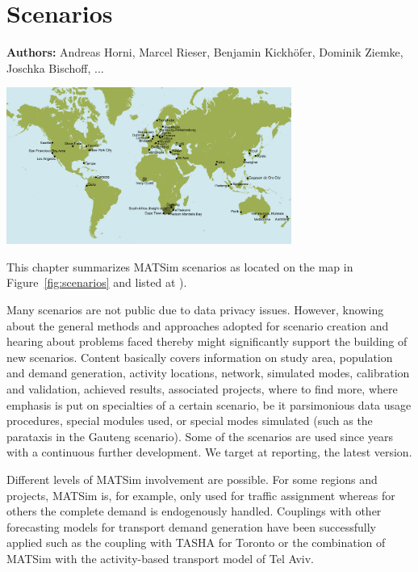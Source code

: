 \chapter{Scenarios}
\label{ch:scenarios}

\hfill \textbf{Authors:} Andreas Horni, Marcel Rieser, Benjamin Kickhöfer, Dominik Ziemke, Joschka Bischoff, ...

\begin{center} \includegraphics[width=0.7\textwidth, angle=0]{using/figures/MATSimModelsMap} \end{center}

This chapter summarizes MATSim scenarios as located on the map in Figure~\ref{fig:scenarios} and listed at \citet[][]{MATSIM-T-Scenarios_Webpage_2014}).

Many scenarios are not public due to data privacy issues. However, knowing about the general methods and approaches adopted for scenario creation and hearing about problems faced thereby might significantly support the building of new scenarios. Content basically covers information on study area, population and demand generation, activity locations, network, simulated modes, calibration and validation, achieved results, associated projects, where to find more, where emphasis is put on specialties of a certain scenario, be it parsimonious data usage procedures, special modules used, or special modes simulated (such as the parataxis in the Gauteng scenario). Some of the scenarios are used since years with a continuous further development. We target at reporting, the latest version. 

Different levels of MATSim involvement are possible. For some regions and projects, MATSim is, for example, only used for traffic assignment whereas for others the complete demand is endogenously handled. Couplings with other forecasting models for transport demand generation have been successfully applied such as the coupling with TASHA for Toronto or the combination of MATSim with the activity-based transport model of Tel Aviv.

